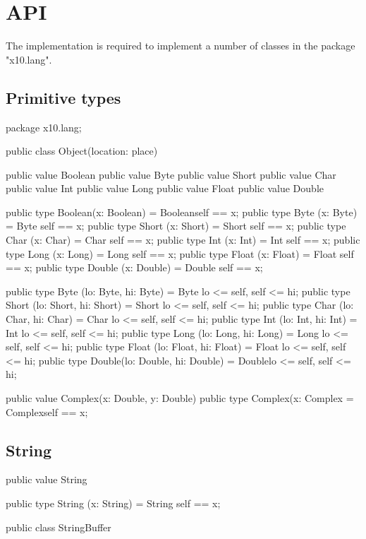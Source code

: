 \chapter{API}\label{XtenAPI}

The \Xten{} implementation is required to implement a number of
classes in the package \xcd"x10.lang".

\section{Primitive types}

\begin{xten}
package x10.lang;

public class Object(location: place) { }

public value Boolean { }
public value Byte    { }
public value Short   { }
public value Char    { }
public value Int     { }
public value Long    { }
public value Float   { }
public value Double  { }

public type Boolean(x: Boolean) = Boolean{self == x};
public type Byte   (x: Byte)    = Byte   {self == x};
public type Short  (x: Short)   = Short  {self == x};
public type Char   (x: Char)    = Char   {self == x};
public type Int    (x: Int)     = Int    {self == x};
public type Long   (x: Long)    = Long   {self == x};
public type Float  (x: Float)   = Float  {self == x};
public type Double (x: Double)  = Double {self == x};

public type Byte  (lo: Byte,   hi: Byte)   = Byte  {lo <= self, self <= hi};
public type Short (lo: Short,  hi: Short)  = Short {lo <= self, self <= hi};
public type Char  (lo: Char,   hi: Char)   = Char  {lo <= self, self <= hi};
public type Int   (lo: Int,    hi: Int)    = Int   {lo <= self, self <= hi};
public type Long  (lo: Long,   hi: Long)   = Long  {lo <= self, self <= hi};
public type Float (lo: Float,  hi: Float)  = Float {lo <= self, self <= hi};
public type Double(lo: Double, hi: Double) = Double{lo <= self, self <= hi};

public value Complex(x: Double, y: Double) { }
public type Complex(x: Complex  = Complex{self == x};
\end{xten}

\section{String}

\begin{xten}
public value String  { }

public type String (x: String)  = String {self == x};

public class StringBuffer { }
\end{xten}

